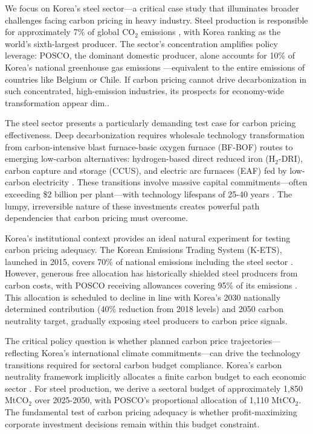 \documentclass[preprint,1p,authoryear]{elsarticle}
\begin{document}
We focus on Korea's steel sector—a critical case study that illuminates broader challenges facing carbon pricing in heavy industry. Steel production is responsible for approximately 7\% of global CO$_2$ emissions \citep{worldsteel2022}, with Korea ranking as the world's sixth-largest producer. The sector's concentration amplifies policy leverage: POSCO, the dominant domestic producer, alone accounts for 10\% of Korea's national greenhouse gas emissions \citep{KOSIS2023}—equivalent to the entire emissions of countries like Belgium or Chile. If carbon pricing cannot drive decarbonization in such concentrated, high-emission industries, its prospects for economy-wide transformation appear dim.. 

The steel sector presents a particularly demanding test case for carbon pricing effectiveness. Deep decarbonization requires wholesale technology transformation from carbon-intensive blast furnace-basic oxygen furnace (BF-BOF) routes to emerging low-carbon alternatives: hydrogen-based direct reduced iron (H$_2$-DRI), carbon capture and storage (CCUS), and electric arc furnaces (EAF) fed by low-carbon electricity \citep{IEA2020steel}. These transitions involve massive capital commitments—often exceeding \$2 billion per plant—with technology lifespans of 25-40 years \citep{MaterialEconomics2019}. The lumpy, irreversible nature of these investments creates powerful path dependencies that carbon pricing must overcome.

Korea's institutional context provides an ideal natural experiment for testing carbon pricing adequacy. The Korean Emissions Trading System (K-ETS), launched in 2015, covers 70\% of national emissions including the steel sector \citep{kim2021kets}. However, generous free allocation has historically shielded steel producers from carbon costs, with POSCO receiving allowances covering 95\% of its emissions \citep{ICAP2024}. This allocation is scheduled to decline in line with Korea's 2030 nationally determined contribution (40\% reduction from 2018 levels) and 2050 carbon neutrality target, gradually exposing steel producers to carbon price signals.

The critical policy question is whether planned carbon price trajectories—reflecting Korea's international climate commitments—can drive the technology transitions required for sectoral carbon budget compliance. Korea's carbon neutrality framework implicitly allocates a finite carbon budget to each economic sector \citep{korea2020carbon}. For steel production, we derive a sectoral budget of approximately 1,850 MtCO$_2$ over 2025-2050, with POSCO's proportional allocation of 1,110 MtCO$_2$. The fundamental test of carbon pricing adequacy is whether profit-maximizing corporate investment decisions remain within this budget constraint.
\end{document}
